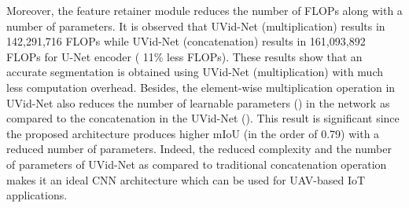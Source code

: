 \documentclass[journal]{IEEEtran}
\begin{document}
Moreover, the feature retainer module reduces the number of FLOPs along with a number of parameters. It is observed that UVid-Net (multiplication) results in 142,291,716 FLOPs while UVid-Net (concatenation) results in 161,093,892 FLOPs for U-Net encoder ( 11\% less FLOPs). These results show that an accurate segmentation is obtained using UVid-Net (multiplication) with much less computation overhead. Besides, the element-wise multiplication operation in UVid-Net also reduces the number of learnable parameters  () in the network as compared to the concatenation in the UVid-Net (). This result is significant since the proposed architecture produces higher mIoU (in the order of 0.79) with a reduced number of parameters. Indeed, the reduced complexity and the number of parameters of UVid-Net as compared to traditional concatenation operation makes it an ideal CNN architecture which can be used for UAV-based IoT applications.
\end{document}
